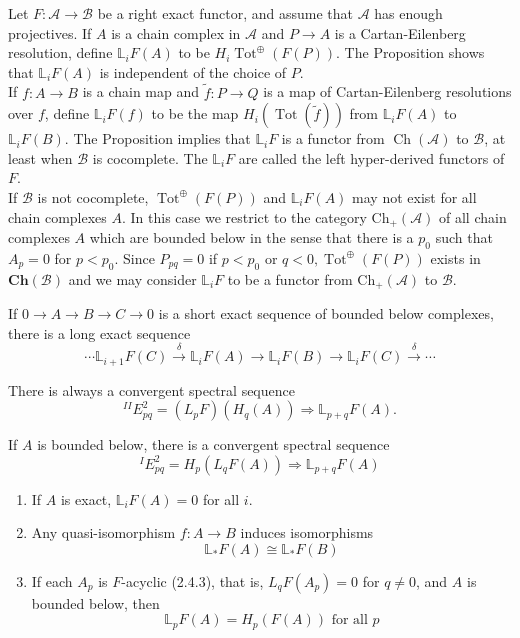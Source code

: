\begin{example}
Let $F: \mathcal{A} \rightarrow \mathcal{B}$ be a right exact functor, and assume that $\mathcal{A}$ has enough projectives. If $A$ is a chain complex in $\mathcal{A}$ and $P \rightarrow A$ is a Cartan-Eilenberg resolution, define $\mathbb{L}_i F(A)$ to be $H_i \operatorname{Tot}^{\oplus}(F(P))$. The Proposition shows that $\mathbb{L}_i F(A)$ is independent of the choice of $P$.\\
If $f: A \rightarrow B$ is a chain map and $\tilde{f}: P \rightarrow Q$ is a map of Cartan-Eilenberg resolutions over $f$, define $\mathbb{L}_i F(f)$ to be the map $H_i(\operatorname{Tot}(\tilde{f}))$ from $\mathbb{L}_i F(A)$ to $\mathbb{L}_i F(B)$. The Proposition implies that $\mathbb{L}_i F$ is a functor from $\operatorname{Ch}(\mathcal{A})$ to $\mathcal{B}$, at least when $\mathcal{B}$ is cocomplete. The $\mathbb{L}_i F$ are called the left hyper-derived functors of $F$.\\
If $\mathcal{B}$ is not cocomplete, $\operatorname{Tot}^{\oplus}(F(P))$ and $\mathbb{L}_i F(A)$ may not exist for all chain complexes $A$. In this case we restrict to the category $\mathrm{Ch}_{+}(\mathcal{A})$ of all chain complexes $A$ which are bounded below in the sense that there is a $p_0$ such that $A_p=0$ for $p<p_0$. Since $P_{p q}=0$ if $p<p_0$ or $q<0, \operatorname{Tot}^{\oplus}(F(P))$ exists in $\mathbf{C h}(\mathcal{B})$ and we may consider $\mathbb{L}_i F$ to be a functor from $\mathrm{Ch}_{+}(\mathcal{A})$ to $\mathcal{B}$.

\begin{lemm}
If $0 \rightarrow A \rightarrow B \rightarrow C \rightarrow 0$ is a short exact sequence of bounded below complexes, there is a long exact sequence
    $$
    \cdots \mathbb{L}_{i+1} F(C) \xrightarrow{\delta} \mathbb{L}_i F(A) \rightarrow \mathbb{L}_i F(B) \rightarrow \mathbb{L}_i F(C) \xrightarrow{\delta} \cdots
    $$    
\end{lemm}


\begin{prop}
There is always a convergent spectral sequence
    $$
    { }^{I I} E_{p q}^2=\left(L_p F\right)\left(H_q(A)\right) \Rightarrow \mathbb{L}_{p+q} F(A) .
    $$
    
    If $A$ is bounded below, there is a convergent spectral sequence
    $$
    { }^I E_{p q}^2=H_p\left(L_q F(A)\right) \Rightarrow \mathbb{L}_{p+q} F(A)
    $$   
\end{prop}

\begin{coro}
\begin{enumerate}
    \item If $A$ is exact, $\mathbb{L}_i F(A)=0$ for all $i$.
    \item Any quasi-isomorphism $f: A \rightarrow B$ induces isomorphisms
    $$
    \mathbb{L}_* F(A) \cong \mathbb{L}_* F(B)
    $$
    \item If each $A_p$ is $F$-acyclic (2.4.3), that is, $L_q F\left(A_p\right)=0$ for $q \neq 0$, and $A$ is bounded below, then
    $$
    \mathbb{L}_p F(A)=H_p(F(A)) \text { for all } p
    $$ 
\end{enumerate}    
\end{coro}


\end{example}

